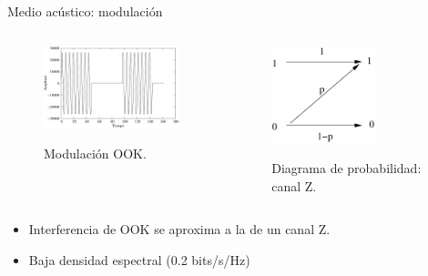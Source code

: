 \documentclass[aspectratio=169]{beamer}
\begin{document}
\begin{frame}{Medio acústico: modulación}

\begin{columns}
  \begin{column}{0.40\textwidth}

  \begin{figure}[t]
  \centering
    \includegraphics[width=5cm]{graphs/modulated.pdf}
    
    Modulación OOK.
    \label{arch:sync}
\end{figure}

  \end{column}
  \begin{column}{0.50\textwidth}
\begin{figure}[th]
  \begin{center}
    \vspace{0.7cm}
    \includegraphics[width=3cm]{../graphs/zchannel}
    
    Diagrama de probabilidad: canal Z.
  \end{center}
  \label{fig:Gal}
\end{figure}

  \end{column}
\end{columns}
\vspace{0.2cm}

\begin{itemize}
 \item Interferencia de OOK se aproxima a la de un canal Z.
 \item Baja densidad espectral (0.2 bits/s/Hz)
\end{itemize}

\end{frame}
\end{document}
